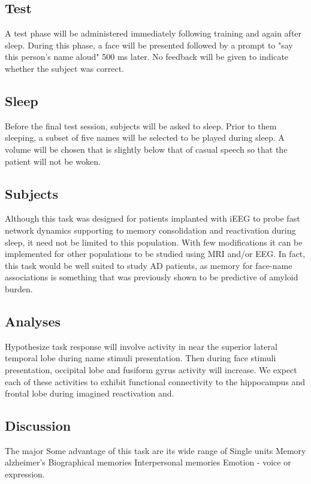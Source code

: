 \subsection*{Test}
A test phase will be administered immediately following training and again after sleep. During this phase, a face will be presented followed by a prompt to "say this person's name aloud" 500 ms later. No feedback will be given to indicate whether the subject was correct.

\subsection*{Sleep}
Before the final test session, subjects will be asked to sleep. Prior to them sleeping, a subset of five names will be selected to be played during sleep. A volume will be chosen that is slightly below that of casual speech so that the patient will not be woken.
\cite{Sharon2017}

\subsection*{Subjects}
Although this task was designed for patients implanted with iEEG to probe fast network dynamics supporting to memory consolidation and reactivation during sleep, it need not be limited to this population. With few modifications it can be implemented for other populations to be studied using MRI and/or EEG. In fact, this task would be well suited to study AD patients, as memory for face-name associations is something that was previously shown to be predictive of amyloid burden.

\subsection*{Analyses}
Hypothesize task response will involve activity in near the superior lateral temporal lobe during name stimuli presentation. Then during face stimuli presentation, occipital lobe and fusiform gyrus activity will increase. We expect each of these activities to exhibit functional connectivity to the hippocampus and frontal lobe during imagined reactivation and.

\subsection*{Discussion}
The major Some advantage of this task are its wide range of  Single units
Memory alzheimer's
Biographical memories
Interpersonal memories
Emotion - voice or expression.

